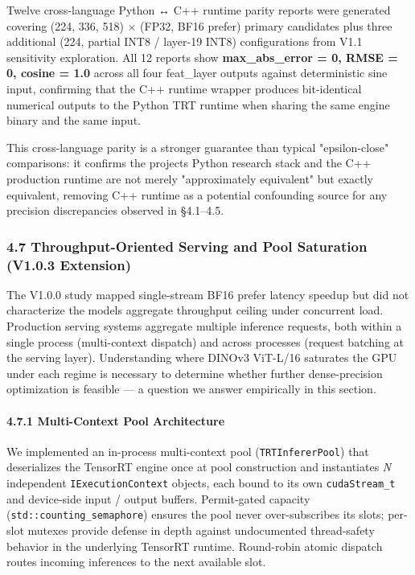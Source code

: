 \documentclass[
]{article}
\begin{document}
Twelve cross-language Python ↔ C++ runtime parity reports were generated
covering (224, 336, 518) × (FP32, BF16 prefer) primary candidates plus
three additional (224, partial INT8 / layer-19 INT8) configurations from
V1.1 sensitivity exploration. All 12 reports show
\textbf{max\_abs\_error = 0, RMSE = 0, cosine = 1.0} across all four
feat\_layer outputs against deterministic sine input, confirming that
the C++ runtime wrapper produces bit-identical numerical outputs to the
Python TRT runtime when sharing the same engine binary and the same
input.

This cross-language parity is a stronger guarantee than typical
"epsilon-close" comparisons: it confirms the project\textquotesingle s
Python research stack and the C++ production runtime are not merely
"approximately equivalent" but exactly equivalent, removing C++ runtime
as a potential confounding source for any precision discrepancies
observed in §4.1--4.5.

\subsubsection{4.7 Throughput-Oriented Serving and Pool Saturation
(V1.0.3
Extension)}\label{47-throughput-oriented-serving-and-pool-saturation-v103-extension}

The V1.0.0 study mapped single-stream BF16 prefer latency speedup but
did not characterize the model\textquotesingle s aggregate throughput
ceiling under concurrent load. Production serving systems aggregate
multiple inference requests, both within a single process (multi-context
dispatch) and across processes (request batching at the serving layer).
Understanding where DINOv3 ViT-L/16 saturates the GPU under each regime
is necessary to determine whether further dense-precision optimization
is feasible --- a question we answer empirically in this section.

\paragraph{4.7.1 Multi-Context Pool
Architecture}\label{471-multi-context-pool-architecture}

We implemented an in-process multi-context pool
(\texttt{TRTInfererPool}) that deserializes the TensorRT engine once at
pool construction and instantiates \emph{N} independent
\texttt{IExecutionContext} objects, each bound to its own
\texttt{cudaStream\_t} and device-side input / output buffers.
Permit-gated capacity (\texttt{std::counting\_semaphore}) ensures the
pool never over-subscribes its slots; per-slot mutexes provide defense
in depth against undocumented thread-safety behavior in the underlying
TensorRT runtime. Round-robin atomic dispatch routes incoming inferences
to the next available slot.
\end{document}
